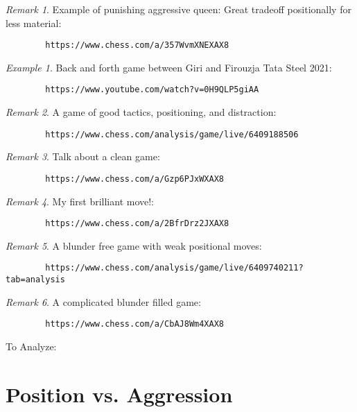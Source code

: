 \documentclass[11pt]{article}
\theoremstyle{remark}
\newtheorem{remark}{Remark}
\newtheorem{example}{Example}
\begin{document}
\begin{remark}
	Example of punishing aggressive queen: Great tradeoff positionally for less material: 
	\begin{verbatim}
		https://www.chess.com/a/357WvmXNEXAX8
	\end{verbatim}
\end{remark}

\begin{example}
	Back and forth game between Giri and Firouzja Tata Steel 2021: 
	\begin{verbatim}
		https://www.youtube.com/watch?v=0H9QLP5giAA
	\end{verbatim}
\end{example}

\begin{remark}
	A game of good tactics, positioning, and distraction: 
	\begin{verbatim}
		https://www.chess.com/analysis/game/live/6409188506
	\end{verbatim}
\end{remark}

\begin{remark}
	Talk about a clean game:
	\begin{verbatim}
		https://www.chess.com/a/Gzp6PJxWXAX8
	\end{verbatim}
\end{remark}

\begin{remark}
	My first brilliant move!:
	\begin{verbatim}
		https://www.chess.com/a/2BfrDrz2JXAX8
	\end{verbatim}
\end{remark}

\begin{remark}
	A blunder free game with weak positional moves:
	\begin{verbatim}
		https://www.chess.com/analysis/game/live/6409740211?tab=analysis
	\end{verbatim}
\end{remark}

\begin{remark}
	A complicated blunder filled game:
	\begin{verbatim}
		https://www.chess.com/a/CbAJ8Wm4XAX8
	\end{verbatim}	

	To Analyze:
\end{remark}

\section{Position vs. Aggression}
\end{document}
